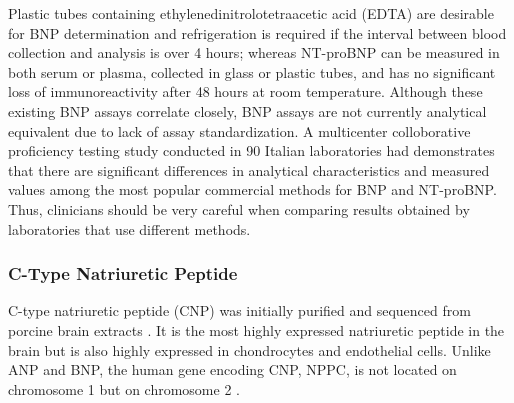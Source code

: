 \documentclass[14pt,a4paper,onecolumn]{extarticle}
\begin{document}
Plastic tubes containing ethylenedinitrolotetraacetic acid (EDTA) are desirable for BNP determination and refrigeration is required if the interval between blood collection and analysis is over 4 hours; whereas NT-proBNP can be measured in both serum or plasma, collected in glass or plastic tubes, and has no significant loss of immunoreactivity after 48 hours at room temperature. Although these existing BNP assays correlate closely, BNP assays are not currently analytical equivalent due to lack of assay standardization.
 A multicenter colloborative proficiency testing study conducted in 90 Italian laboratories had demonstrates that there are significant differences in analytical characteristics and measured values among the most popular commercial methods for BNP and NT-proBNP. Thus, clinicians should be very careful when comparing results obtained by laboratories that use different methods.


\subsubsection{C-Type Natriuretic Peptide}
C-type natriuretic peptide (CNP) was initially purified and sequenced from porcine brain extracts \citep{Sudoh1990}. It is the most highly expressed natriuretic peptide in the brain but is also highly expressed in chondrocytes and endothelial cells. Unlike ANP and BNP, the human gene encoding CNP, NPPC, is not located on chromosome 1 but on chromosome 2 \citep{Ogawa1994b}.
\end{document}

